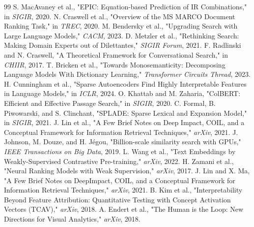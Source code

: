 \documentclass[sigconf,authordraft]{acmart}
\begin{document}
\begin{thebibliography}{99}
 S. MacAvaney et al., "EPIC: Equation-based Prediction of IR Combinations," in \textit{SIGIR}, 2020.
 N. Craswell et al., "Overview of the MS MARCO Document Ranking Task," in \textit{TREC}, 2020.
 M. Bendersky et al., "Upgrading Search with Large Language Models," \textit{CACM}, 2023.
 D. Metzler et al., "Rethinking Search: Making Domain Experts out of Dilettantes," \textit{SIGIR Forum}, 2021.
 F. Radlinski and N. Craswell, "A Theoretical Framework for Conversational Search," in \textit{CHIIR}, 2017.
 T. Bricken et al., "Towards Monosemanticity: Decomposing Language Models With Dictionary Learning," \textit{Transformer Circuits Thread}, 2023.
 H. Cunningham et al., "Sparse Autoencoders Find Highly Interpretable Features in Language Models," in \textit{ICLR}, 2024.
 O. Khattab and M. Zaharia, "ColBERT: Efficient and Effective Passage Search," in \textit{SIGIR}, 2020.
 C. Formal, B. Piwowarski, and S. Clinchant, "SPLADE: Sparse Lexical and Expansion Model," in \textit{SIGIR}, 2021.
 J. Lin et al., "A Few Brief Notes on Deep Impact, COIL, and a Conceptual Framework for Information Retrieval Techniques," \textit{arXiv}, 2021.
 J. Johnson, M. Douze, and H. Jégou, "Billion-scale similarity search with GPUs," \textit{IEEE Transactions on Big Data}, 2019.
 L. Wang et al., "Text Embeddings by Weakly-Supervised Contrastive Pre-training," \textit{arXiv}, 2022.
 H. Zamani et al., "Neural Ranking Models with Weak Supervision," \textit{arXiv}, 2017.
 J. Lin and X. Ma, "A Few Brief Notes on DeepImpact, COIL, and a Conceptual Framework for Information Retrieval Techniques," \textit{arXiv}, 2021.
 B. Kim et al., "Interpretability Beyond Feature Attribution: Quantitative Testing with Concept Activation Vectors (TCAV)," \textit{arXiv}, 2018.
 A. Endert et al., "The Human is the Loop: New Directions for Visual Analytics," \textit{arXiv}, 2018.
\end{thebibliography}
\end{document}
